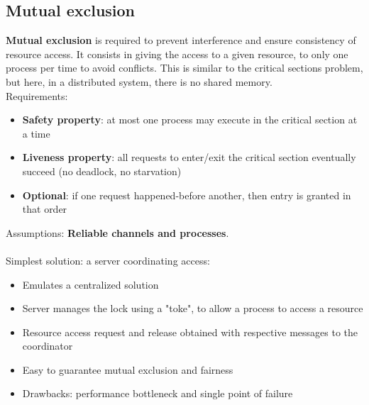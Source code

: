 \documentclass[10pt,a4paper]{article}
\begin{document}
\subsection{Mutual exclusion}
\textbf{Mutual exclusion} is required to prevent interference and ensure consistency of resource access. It consists in giving the access to a given resource, to only one process per time to avoid conflicts. This is similar to the critical sections problem, but here, in a distributed system, there is no shared memory. \\
Requirements:
\begin{itemize}
	\item \textbf{Safety property}: at most one process may execute in the critical section at a time
	\item \textbf{Liveness property}: all requests to enter/exit the critical section eventually succeed (no deadlock, no starvation)
	\item \textbf{Optional}: if one request happened-before another, then entry is granted in that order
\end{itemize}
Assumptions: \textbf{Reliable channels and processes}. \\ \\
Simplest solution: a server coordinating access:
\begin{itemize}
	\item Emulates a centralized solution
	\item Server manages the lock using a "toke", to allow a process to access a resource
	\item Resource access request and release obtained with respective messages to the coordinator
	\item Easy to guarantee mutual exclusion and fairness
	\item Drawbacks: performance bottleneck and single point of failure
\end{itemize}
\end{document}
